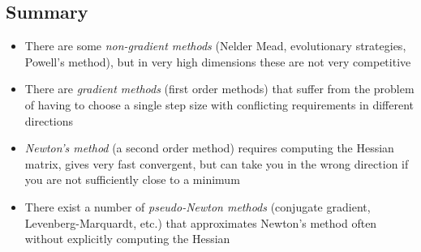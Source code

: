 \begin{slide}
\section[-2]{Summary}

\begin{PauseHighLight}
  \begin{itemize}
  \item There are some \emph{non-gradient methods} (Nelder Mead, evolutionary
    strategies, Powell's method), but in very high dimensions these
    are not very competitive\pause
  \item There are \emph{gradient methods} (first order methods) that
    suffer from the problem of having to choose a single step size
    with conflicting requirements in different directions\pause
  \item \emph{Newton's method} (a second order method) requires
    computing the Hessian matrix, gives very fast convergent, but can
    take you in the wrong direction if you are not sufficiently close
    to a minimum\pause
  \item There exist a number of \emph{pseudo-Newton methods}
    (conjugate gradient, Levenberg-Marquardt, etc.) that
    approximates Newton's method often without explicitly computing
    the Hessian\pause
  \end{itemize}
\end{PauseHighLight}


\end{slide}




